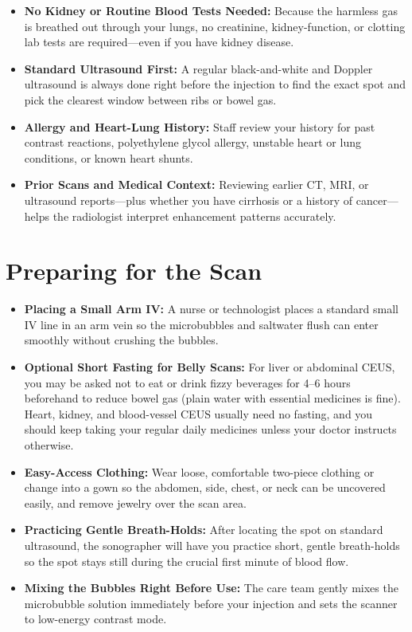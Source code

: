 \begin{itemize}
    \item \textbf{No Kidney or Routine Blood Tests Needed:} Because the harmless gas is breathed out through your lungs, no creatinine, kidney-function, or clotting lab tests are required---even if you have kidney disease.
    \item \textbf{Standard Ultrasound First:} A regular black-and-white and Doppler ultrasound is always done right before the injection to find the exact spot and pick the clearest window between ribs or bowel gas.
    \item \textbf{Allergy and Heart-Lung History:} Staff review your history for past contrast reactions, polyethylene glycol allergy, unstable heart or lung conditions, or known heart shunts.
    \item \textbf{Prior Scans and Medical Context:} Reviewing earlier CT, MRI, or ultrasound reports---plus whether you have cirrhosis or a history of cancer---helps the radiologist interpret enhancement patterns accurately.
\end{itemize}

\section{Preparing for the Scan}

\begin{itemize}
    \item \textbf{Placing a Small Arm IV:} A nurse or technologist places a standard small IV line in an arm vein so the microbubbles and saltwater flush can enter smoothly without crushing the bubbles.
    \item \textbf{Optional Short Fasting for Belly Scans:} For liver or abdominal CEUS, you may be asked not to eat or drink fizzy beverages for 4--6 hours beforehand to reduce bowel gas (plain water with essential medicines is fine). Heart, kidney, and blood-vessel CEUS usually need no fasting, and you should keep taking your regular daily medicines unless your doctor instructs otherwise.
    \item \textbf{Easy-Access Clothing:} Wear loose, comfortable two-piece clothing or change into a gown so the abdomen, side, chest, or neck can be uncovered easily, and remove jewelry over the scan area.
    \item \textbf{Practicing Gentle Breath-Holds:} After locating the spot on standard ultrasound, the sonographer will have you practice short, gentle breath-holds so the spot stays still during the crucial first minute of blood flow.
    \item \textbf{Mixing the Bubbles Right Before Use:} The care team gently mixes the microbubble solution immediately before your injection and sets the scanner to low-energy contrast mode.
\end{itemize}

